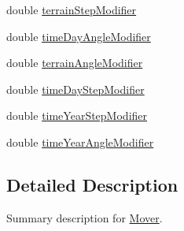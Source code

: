 \begin{DoxyCompactItemize}
double \hyperlink{class_p_a_z___dispersal_1_1_mover_af32839ae1caee68ca2c51d3606dedb62}{terrain\-Step\-Modifier}
\item 
double \hyperlink{class_p_a_z___dispersal_1_1_mover_ac30a1e5999d3aa84998911717a9bcf94}{time\-Day\-Angle\-Modifier}
\item 
double \hyperlink{class_p_a_z___dispersal_1_1_mover_a0db219e73814623da78a80ec8ad7055d}{terrain\-Angle\-Modifier}
\item 
double \hyperlink{class_p_a_z___dispersal_1_1_mover_a1037b53f6cf05abe6d5d59c42a0289dc}{time\-Day\-Step\-Modifier}
\item 
double \hyperlink{class_p_a_z___dispersal_1_1_mover_a2a4289305fd1b351602fe58acc4d48ea}{time\-Year\-Step\-Modifier}
\item 
double \hyperlink{class_p_a_z___dispersal_1_1_mover_a1ddc522f340897893a1456edd5c8678c}{time\-Year\-Angle\-Modifier}
\end{DoxyCompactItemize}


\subsection{Detailed Description}
Summary description for \hyperlink{class_p_a_z___dispersal_1_1_mover}{Mover}. 



